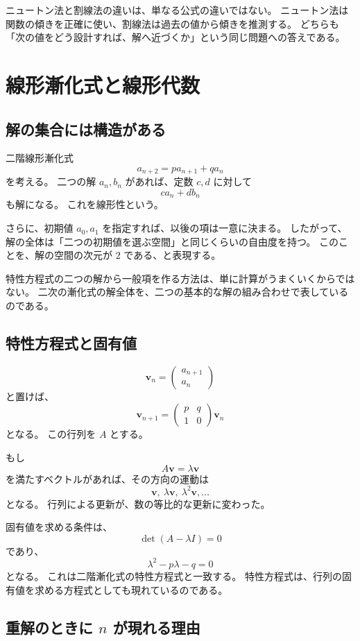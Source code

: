 ニュートン法と割線法の違いは、単なる公式の違いではない。
ニュートン法は関数の傾きを正確に使い、割線法は過去の値から傾きを推測する。
どちらも「次の値をどう設計すれば、解へ近づくか」という同じ問題への答えである。

\section{線形漸化式と線形代数}

\subsection{解の集合には構造がある}

二階線形漸化式
\[
  a_{n+2}=pa_{n+1}+qa_n
\]
を考える。
二つの解 $a_n,b_n$ があれば、定数 $c,d$ に対して
\[
  c a_n+d b_n
\]
も解になる。
これを線形性という。

さらに、初期値 $a_0,a_1$ を指定すれば、以後の項は一意に決まる。
したがって、解の全体は「二つの初期値を選ぶ空間」と同じくらいの自由度を持つ。
このことを、解の空間の次元が $2$ である、と表現する。

特性方程式の二つの解から一般項を作る方法は、単に計算がうまくいくからではない。
二次の漸化式の解全体を、二つの基本的な解の組み合わせで表しているのである。

\subsection{特性方程式と固有値}

\[
  \boldsymbol v_n=
  \begin{pmatrix}a_{n+1}\\a_n\end{pmatrix}
\]
と置けば、
\[
  \boldsymbol v_{n+1}
  =
  \begin{pmatrix}p&q\\1&0\end{pmatrix}
  \boldsymbol v_n
\]
となる。
この行列を $A$ とする。

もし
\[
  A\boldsymbol v=\lambda\boldsymbol v
\]
を満たすベクトルがあれば、その方向の運動は
\[
  \boldsymbol v,\ \lambda\boldsymbol v,\ \lambda^2\boldsymbol v,\ldots
\]
となる。
行列による更新が、数の等比的な更新に変わった。

固有値を求める条件は、
\[
  \det(A-\lambda I)=0
\]
であり、
\[
  \lambda^2-p\lambda-q=0
\]
となる。
これは二階漸化式の特性方程式と一致する。
特性方程式は、行列の固有値を求める方程式としても現れているのである。

\subsection{重解のときに $n$ が現れる理由}

